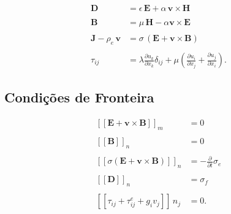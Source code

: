 \begin{align*}
\mathbf{D}&=\epsilon\,\mathbf{E}+\alpha\,\mathbf{v}\times\mathbf{H}\\\\
\mathbf{B}&=\mu\,\mathbf{H}-\alpha\mathbf{v}\times\mathbf{E}\\\\
\mathbf{J}-\rho_e\,\mathbf{v}&=\sigma\,(\mathbf{E}+\mathbf{v}\times\mathbf{B})\\\\
\tau_{ij}&=\lambda\frac{\partial u_k}{\partial x_k}\delta_{ij}+\mu\left(\frac{\partial u_i}{\partial x_j}+\frac{\partial u_j}{\partial x_i}\right).
\end{align*}

\subsection{Condi\c{c}\~oes de Fronteira}

\begin{align*}
\left[\left[\mathbf{E}+\mathbf{v}\times\mathbf{B}\right]\right]_m&=0\\\\
\left[\left[\mathbf{B}\right]\right]_n&=0\\\\
\left[\left[\sigma(\mathbf{E}+\mathbf{v}\times\mathbf{B})\right]\right]_n&=-\frac{\partial}{\partial t}\sigma_e\\\\
\left[\left[\mathbf{D}\right]\right]_n&=\sigma_f\\\\
\left[\left[\tau_{ij}+\tau^e_{ij}+g_iv_j\right]\right]\,n_j&=0.
\end{align*}

